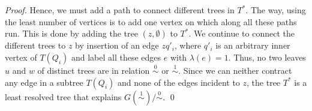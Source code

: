 \documentclass[smallextended]{svjour3}
\newcommand{\rev}[1]{\begingroup\color{blue}#1\endgroup}
\newcommand{\remove}[1]{\begingroup\tiny\color{yellow}#1\endgroup}
\newcommand{\Ro}{\mathrel{\overset{0}{\sim}}}
\newcommand{\Rl}{\mathrel{\overset{1}{\sim}}}
\begin{document}
\begin{proof}
{  Hence, we must add a path to connect different trees in $T^*$.  The way,
  using the least number of vertices is to add one vertex on which along
  all these paths run. This is done by adding the tree $({z},\emptyset)$ to
  $T^*$.  We continue to connect the different trees to $z$ by insertion of
  an edge $zq'_i$, where $q'_i$ is an arbitrary inner vertex of $T(Q_i)$
  and label all these edges $e$ with $\lambda(e)=1$.  Thus, no two leaves
  $u$ and $w$ of distinct trees are in relation $\Ro$ or $\Rl$. 
 \rev Since we can neither contract any edge in a subtree $T(Q_i)$ and none
	of the edges incident to $z$, 	}
	the  tree $T^*$ is a least resolved tree that explains $G(\Rl)/\Ro$.  \qed
%        
%
%

\end{proof}
\end{document}
